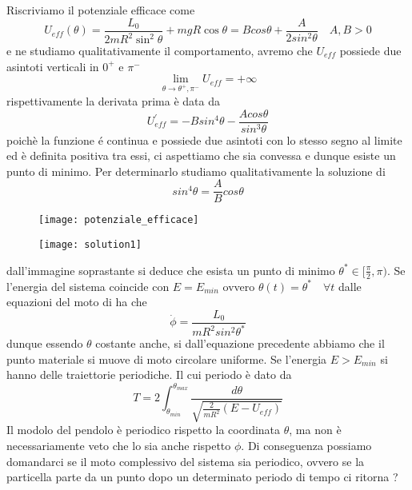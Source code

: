 \noindent Riscriviamo il potenziale efficace come
\begin{equation*}
	U_{eff}(\theta) = \frac{L_0}{2 m R^2 \sin ^2 \theta}+m g R \cos \theta = Bcos\theta + \frac{A}{2sin^2\theta} \quad A,B >0
\end{equation*}
e ne studiamo qualitativamente il comportamento, avremo che $U_{eff}$ possiede due asintoti verticali in $0^+$ e $\pi^{-}$
\begin{equation*}
	\lim_{\theta \rightarrow \theta^+,\pi^{-}} U_{eff} = + \infty 
\end{equation*}
rispettivamente la derivata prima \`{e} data da 
\begin{equation*}
	U_{eff}^{\prime} = -Bsin^4\theta - \frac{Acos\theta}{sin^3\theta}
\end{equation*}
poich\`{e} la funzione \'{e} continua e  possiede due asintoti con lo stesso segno al limite ed \`{e} definita positiva tra essi, ci aspettiamo che sia convessa e dunque esiste un punto di minimo. Per determinarlo studiamo qualitativamente la soluzione di
\begin{equation*}
	sin^4\theta = \frac{A}{B}cos\theta
\end{equation*}
\newpage
\begin{figure}
\centering
\begin{minipage}{.5\textwidth}
  \centering
  \texttt{[image: potenziale\_efficace]}
\end{minipage}%
\begin{minipage}{.5\textwidth}
  \centering
  \texttt{[image: solution1]}
\end{minipage}
\end{figure}
\noindent dall'immagine soprastante si deduce che esista un punto di minimo $\theta^* \in [\frac{\pi}{2},\pi)$. Se l'energia del sistema coincide con $E = E_{min}$ ovvero $\theta(t) = \theta^* \quad \forall t$ dalle equazioni del moto di ha che 
\begin{equation*}
	\dot{\phi} = \frac{L_0}{mR^2 sin^2\theta^*}
\end{equation*}
dunque essendo $\theta$ costante anche, si dall'equazione precedente abbiamo che il punto materiale si muove di moto circolare uniforme. Se l'energia $E > E_{min}$ si hanno delle traiettorie periodiche. Il cui periodo \`{e} dato da 
\begin{equation}
	T = 2\int_{\theta_{min}}^{{\theta_{max}}} \frac{d\theta}{\sqrt{\frac{2}{mR^2}(E-U_{eff})}}
\end{equation}
Il modolo del pendolo \`{e} periodico rispetto la coordinata $\theta$, ma non \`{e} necessariamente veto che lo sia anche rispetto $\phi$. Di conseguenza possiamo domandarci se il moto complessivo del sistema sia periodico, ovvero se la particella parte da un punto dopo un determinato periodo di tempo ci ritorna ?

